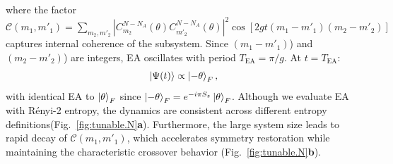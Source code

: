 \documentclass[reprint,superscriptaddress,preprintnumbers,longbibliography,
amsmath,amssymb,aps,floatfix,pra,twocolumn, tightenlines %
]{revtex4-2}
\begin{document}
    where the factor $\mathcal{C}(m_1, m'_1) = \sum_{m_2, m'_2} |C^{N-N_A}_{m_2}(\theta) C^{N-N_A}_{m'_2}(\theta)|^2 \cos[2gt(m_1 - m'_1)(m_2 - m'_2)]$ captures internal coherence of the subsystem. 
    Since $(m_1 - m'_1)$) and $(m_2 - m'_2)$) are integers, EA oscillates with period $T_{\text{EA}} = \pi/g$. At $t = T_{\text{EA}}$:
    \begin{equation}\label{state.pi.2}
    \ket{\Psi(t)} \propto \ket{{-}\theta}_F,
    \end{equation}
    with identical EA to $\ket{\theta}_F$ since $\ket{{-}\theta}_F = e^{-i\pi S_z} \ket{\theta}_F$.
    Although we evaluate EA with Rényi-2 entropy, the dynamics are consistent across different entropy definitions(Fig.~\ref{fig:tunable.N}\textbf{a}). Furthermore, the large system size leads to rapid decay of $\mathcal{C}(m_1, m'_1)$, which accelerates symmetry restoration while maintaining the characteristic crossover behavior (Fig.~\ref{fig:tunable.N}\textbf{b}).
    
    
\end{document}
